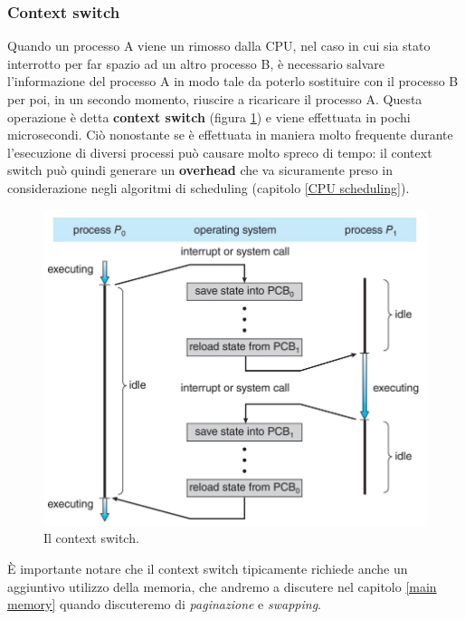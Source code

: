 % 
\subsubsection{Context switch}\label{context_switch}
Quando un processo A viene un rimosso dalla CPU, nel caso in cui sia stato interrotto per far spazio ad un altro processo B, è necessario salvare l'informazione del processo A in modo tale da poterlo sostituire con il processo B per poi, in un secondo momento, riuscire a ricaricare il processo A. Questa operazione è  detta \textbf{context switch} (figura \ref{fig:context_switch}) e viene effettuata in pochi microsecondi. Ciò nonostante se è effettuata in maniera molto frequente durante l'esecuzione di diversi processi può causare molto spreco di tempo: il context switch può quindi generare un \textbf{overhead} che va sicuramente preso in considerazione negli algoritmi di scheduling (capitolo \ref{CPU scheduling}).
\begin{figure}[h]
    \centering
    \includegraphics[width = .7\textwidth]{../res/imgs/processes/context_switch.png}
    \caption{Il context switch.}
    \label{fig:context_switch}
\end{figure}
È importante notare che il context switch tipicamente richiede anche un aggiuntivo utilizzo della memoria, che andremo a discutere nel capitolo \ref{main memory} quando discuteremo di \textit{paginazione} e \textit{swapping}.

% 
